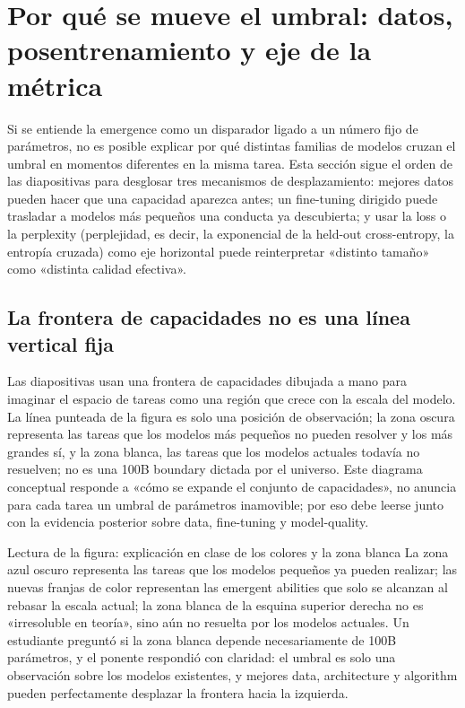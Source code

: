 \section{Por qué se mueve el umbral: datos, posentrenamiento y eje de la métrica}

Si se entiende la emergence como un disparador ligado a un número fijo de parámetros, no es posible explicar por qué distintas familias de modelos cruzan el umbral en momentos diferentes en la misma tarea. Esta sección sigue el orden de las diapositivas para desglosar tres mecanismos de desplazamiento: mejores datos pueden hacer que una capacidad aparezca antes; un fine-tuning dirigido puede trasladar a modelos más pequeños una conducta ya descubierta; y usar la loss o la perplexity (perplejidad, es decir, la exponencial de la held-out cross-entropy, la entropía cruzada) como eje horizontal puede reinterpretar «distinto tamaño» como «distinta calidad efectiva».

\subsection{La frontera de capacidades no es una línea vertical fija}

Las diapositivas usan una frontera de capacidades dibujada a mano para imaginar el espacio de tareas como una región que crece con la escala del modelo. La línea punteada de la figura es solo una posición de observación; la zona oscura representa las tareas que los modelos más pequeños no pueden resolver y los más grandes sí, y la zona blanca, las tareas que los modelos actuales todavía no resuelven; no es una 100B boundary dictada por el universo. Este diagrama conceptual responde a «cómo se expande el conjunto de capacidades», no anuncia para cada tarea un umbral de parámetros inamovible; por eso debe leerse junto con la evidencia posterior sobre data, fine-tuning y model-quality.


\begin{knowledgebox}{Lectura de la figura: explicación en clase de los colores y la zona blanca}
La zona azul oscuro representa las tareas que los modelos pequeños ya pueden realizar; las nuevas franjas de color representan las emergent abilities que solo se alcanzan al rebasar la escala actual; la zona blanca de la esquina superior derecha no es «irresoluble en teoría», sino aún no resuelta por los modelos actuales. Un estudiante preguntó si la zona blanca depende necesariamente de 100B parámetros, y el ponente respondió con claridad: el umbral es solo una observación sobre los modelos existentes, y mejores data, architecture y algorithm pueden perfectamente desplazar la frontera hacia la izquierda.
\end{knowledgebox}

